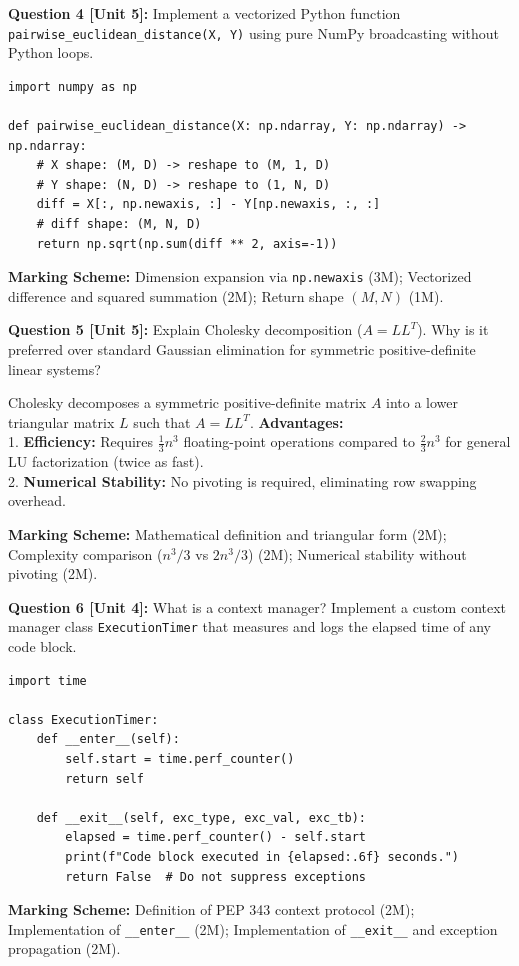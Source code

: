 \noindent\textbf{Question 4 [Unit 5]:} Implement a vectorized Python function \texttt{pairwise\_euclidean\_distance(X, Y)} using pure NumPy broadcasting without Python loops.
\begin{solutionbox}
\begin{lstlisting}
import numpy as np

def pairwise_euclidean_distance(X: np.ndarray, Y: np.ndarray) -> np.ndarray:
    # X shape: (M, D) -> reshape to (M, 1, D)
    # Y shape: (N, D) -> reshape to (1, N, D)
    diff = X[:, np.newaxis, :] - Y[np.newaxis, :, :]
    # diff shape: (M, N, D)
    return np.sqrt(np.sum(diff ** 2, axis=-1))
\end{lstlisting}
\end{solutionbox}
\begin{markingrubric}
\textbf{Marking Scheme:} Dimension expansion via \texttt{np.newaxis} (3M); Vectorized difference and squared summation (2M); Return shape $(M, N)$ (1M).
\end{markingrubric}

\noindent\textbf{Question 5 [Unit 5]:} Explain Cholesky decomposition ($A = L L^T$). Why is it preferred over standard Gaussian elimination for symmetric positive-definite linear systems?
\begin{solutionbox}
Cholesky decomposes a symmetric positive-definite matrix $A$ into a lower triangular matrix $L$ such that $A = L L^T$.
\textbf{Advantages:}\\
1. \textbf{Efficiency:} Requires $\frac{1}{3} n^3$ floating-point operations compared to $\frac{2}{3} n^3$ for general LU factorization (twice as fast).\\
2. \textbf{Numerical Stability:} No pivoting is required, eliminating row swapping overhead.
\end{solutionbox}
\begin{markingrubric}
\textbf{Marking Scheme:} Mathematical definition and triangular form (2M); Complexity comparison ($n^3/3$ vs $2n^3/3$) (2M); Numerical stability without pivoting (2M).
\end{markingrubric}

\noindent\textbf{Question 6 [Unit 4]:} What is a context manager? Implement a custom context manager class \texttt{ExecutionTimer} that measures and logs the elapsed time of any code block.
\begin{solutionbox}
\begin{lstlisting}
import time

class ExecutionTimer:
    def __enter__(self):
        self.start = time.perf_counter()
        return self

    def __exit__(self, exc_type, exc_val, exc_tb):
        elapsed = time.perf_counter() - self.start
        print(f"Code block executed in {elapsed:.6f} seconds.")
        return False  # Do not suppress exceptions
\end{lstlisting}
\end{solutionbox}
\begin{markingrubric}
\textbf{Marking Scheme:} Definition of PEP 343 context protocol (2M); Implementation of \texttt{\_\_enter\_\_} (2M); Implementation of \texttt{\_\_exit\_\_} and exception propagation (2M).
\end{markingrubric}
